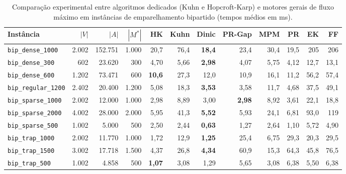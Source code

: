 \begin{table}[!ht]
\centering
\small
\setlength{\tabcolsep}{3.5pt}
\begin{tabular}{lrrrrrrrrrrr}
\toprule
\textbf{Instância} & $|V|$ & $|A|$ & $|M^*|$ & \textbf{HK} & \textbf{Kuhn} & \textbf{Dinic} & \textbf{PR-Gap} & \textbf{MPM} & \textbf{PR} & \textbf{EK} & \textbf{FF} \\
\midrule
\texttt{bip\_dense\_1000} & 2.002 & 152.751 & 1.000 & 20,7 & 76,4 & \textbf{18,4} & 23,4 & 30,4 & 19,5 & 205 & 206 \\
\texttt{bip\_dense\_300} & 602 & 23.620 & 300 & 4,70 & 5,66 & \textbf{2,98} & 4,07 & 5,75 & 4,12 & 12,7 & 13,1 \\
\texttt{bip\_dense\_600} & 1.202 & 73.471 & 600 & \textbf{10,6} & 27,3 & 12,0 & 10,9 & 16,1 & 11,2 & 56,2 & 57,4 \\
\texttt{bip\_regular\_1200} & 2.402 & 20.400 & 1.200 & 5,08 & 18,3 & \textbf{3,53} & 3,58 & 11,7 & 4,68 & 37,5 & 49,1 \\
\texttt{bip\_sparse\_1000} & 2.002 & 12.000 & 1.000 & 2,98 & 8,89 & 3,00 & \textbf{2,98} & 8,92 & 3,61 & 22,1 & 18,8 \\
\texttt{bip\_sparse\_2000} & 4.002 & 28.000 & 2.000 & 5,95 & 41,3 & \textbf{5,52} & 5,93 & 24,1 & 6,81 & 93,0 & 119 \\
\texttt{bip\_sparse\_500} & 1.002 & 5.000 & 500 & 2,50 & 2,44 & \textbf{0,63} & 1,27 & 2,64 & 1,10 & 5,72 & 4,90 \\
\texttt{bip\_trap\_1000} & 2.002 & 11.770 & 1.000 & 1,72 & 12,9 & \textbf{1,25} & 25,4 & 6,75 & 29,3 & 20,3 & 29,5 \\
\texttt{bip\_trap\_1500} & 3.002 & 17.718 & 1.500 & 4,37 & 26,8 & \textbf{4,34} & 60,9 & 15,3 & 64,3 & 45,8 & 76,5 \\
\texttt{bip\_trap\_500} & 1.002 & 4.858 & 500 & \textbf{1,07} & 3,08 & 1,29 & 5,65 & 3,08 & 6,38 & 5,50 & 6,38 \\
\bottomrule
\end{tabular}
\caption{Comparação experimental entre algoritmos dedicados (Kuhn e Hopcroft-Karp) e motores gerais de fluxo máximo em instâncias de emparelhamento bipartido (tempos médios em ms).}
\label{tab:benchmarks_bipartite_matching}
\end{table}
